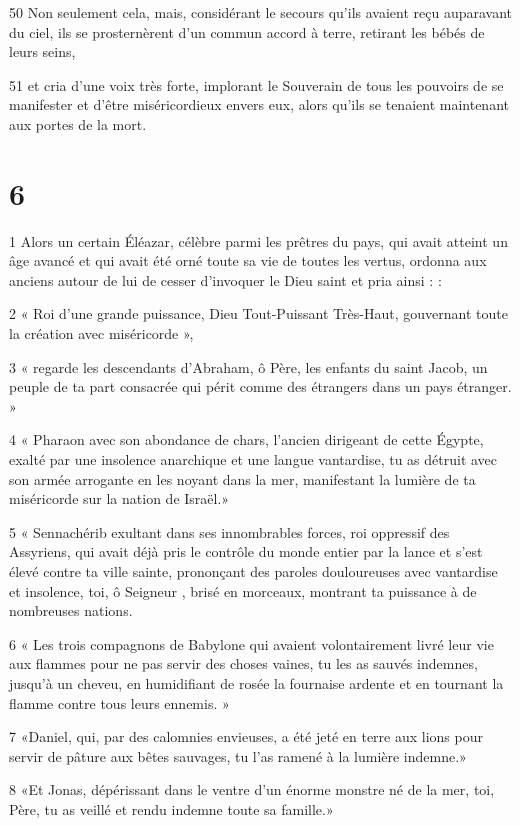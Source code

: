 \par 50 Non seulement cela, mais, considérant le secours qu'ils avaient reçu auparavant du ciel, ils se prosternèrent d'un commun accord à terre, retirant les bébés de leurs seins,
\par 51 et cria d'une voix très forte, implorant le Souverain de tous les pouvoirs de se manifester et d'être miséricordieux envers eux, alors qu'ils se tenaient maintenant aux portes de la mort.

\chapter{6}

\par 1 Alors un certain Éléazar, célèbre parmi les prêtres du pays, qui avait atteint un âge avancé et qui avait été orné toute sa vie de toutes les vertus, ordonna aux anciens autour de lui de cesser d'invoquer le Dieu saint et pria ainsi : :
\par 2 « Roi d'une grande puissance, Dieu Tout-Puissant Très-Haut, gouvernant toute la création avec miséricorde »,
\par 3 « regarde les descendants d'Abraham, ô Père, les enfants du saint Jacob, un peuple de ta part consacrée qui périt comme des étrangers dans un pays étranger. »
\par 4 « Pharaon avec son abondance de chars, l'ancien dirigeant de cette Égypte, exalté par une insolence anarchique et une langue vantardise, tu as détruit avec son armée arrogante en les noyant dans la mer, manifestant la lumière de ta miséricorde sur la nation de Israël.»
\par 5 « Sennachérib exultant dans ses innombrables forces, roi oppressif des Assyriens, qui avait déjà pris le contrôle du monde entier par la lance et s'est élevé contre ta ville sainte, prononçant des paroles douloureuses avec vantardise et insolence, toi, ô Seigneur , brisé en morceaux, montrant ta puissance à de nombreuses nations.
\par 6 « Les trois compagnons de Babylone qui avaient volontairement livré leur vie aux flammes pour ne pas servir des choses vaines, tu les as sauvés indemnes, jusqu'à un cheveu, en humidifiant de rosée la fournaise ardente et en tournant la flamme contre tous leurs ennemis. »
\par 7 «Daniel, qui, par des calomnies envieuses, a été jeté en terre aux lions pour servir de pâture aux bêtes sauvages, tu l'as ramené à la lumière indemne.»
\par 8 «Et Jonas, dépérissant dans le ventre d'un énorme monstre né de la mer, toi, Père, tu as veillé et rendu indemne toute sa famille.»

